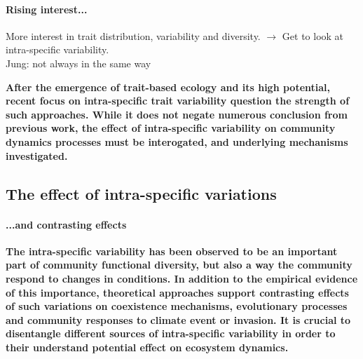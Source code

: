 \paragraph{Rising interest...}
More interest in trait distribution, variability and diversity. $\rightarrow$ Get to look at intra-specific variability.\\
Jung: not always in the same way \parencite{jung_intraspecific_2014}\\

\parencite{poorter_biomass_2012}
\parencite{poorter_leaf_2006}
\parencite{kichenin_contrasting_2013}
\parencite{siefert_global_2015}
\parencite{albert_importance_2012}
\parencite{violle_return_2012}

\textbf{After the emergence of trait-based ecology and its high potential, recent focus on intra-specific trait variability question the strength of such approaches. While it does not negate numerous conclusion from previous work, the effect of intra-specific variability on community dynamics processes must be interogated, and underlying mechanisms investigated.}

\subsection{The effect of intra-specific variations}

\paragraph{...and contrasting effects}

\parencite{hart_how_2016}
\parencite{courbaud_intra-specific_2010}
\parencite{turcotte_phenotypic_2016}
\parencite{roscher_contrasting_2015}
\parencite{valladares_species_2015}
\parencite{barabas_effect_2016}
\parencite{jung_intraspecific_2010}


\textbf{The intra-specific variability has been observed to be an important part of community functional diversity, but also a way the community respond to changes in conditions. In addition to the empirical evidence of this importance, theoretical approaches support contrasting effects of such variations on coexistence mechanisms, evolutionary processes and community responses to climate event or invasion. It is crucial to disentangle different sources of intra-specific variability in order to their understand potential effect on ecosystem dynamics.}

